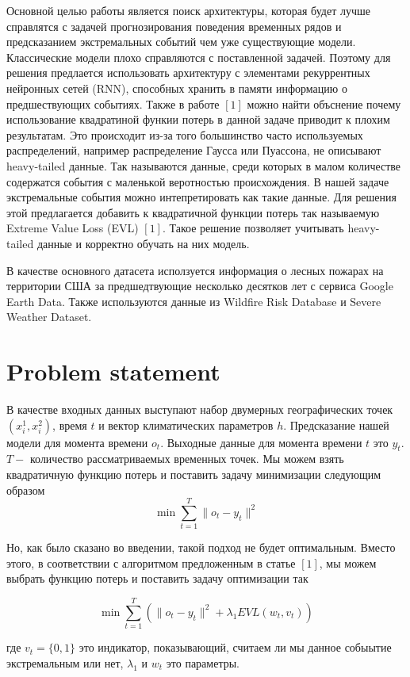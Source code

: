 \documentclass{article}
\begin{document}
Основной целью работы является поиск архитектуры, которая будет лучше справлятся с задачей прогнозирования поведения временных рядов и предсказанием экстремальных событий чем уже существующие модели. Классические модели плохо справляются с поставленной задачей. Поэтому для решения предлается использовать архитектуру с элементами рекуррентных нейронных сетей (RNN), способных хранить в памяти информацию о предшествующих событиях.  Также в работе $[1]$ можно найти объснение почему использование квадратиной функии потерь в данной задаче приводит к плохим результатам. Это происходит из-за того большинство часто используемых распределений, например распределение Гаусса или Пуассона, не описывают heavy-tailed данные. Так называются данные, среди которых в малом количестве содержатся события с маленькой веротностью происхождения. В нашей задаче экстремальные события можно интепретировать как такие данные. Для решения этой предлагается добавить к квадратичной функции потерь так называемую Extreme Value Loss (EVL) $[1]$. Такое решение позволяет учитывать  heavy-tailed данные и корректно обучать на них модель. 

В качестве основного датасета исползуется информация о лесных пожарах на территории США за предшедтвующие несколько десятков лет  с сервиса Google Earth Data. Также используются данные из Wildfire Risk Database и Severe Weather Dataset. 




\section{Problem statement}
\label{sec:headings}

В качестве входных данных выступают набор двумерных географических точек $(x_i^1, x_i^2)$, время $t$ и вектор климатических параметров $h$. Предсказание нашей модели для момента времени $o_t$. Выходные данные для момента времени $t$ это $y_t$. $T - $ количество рассматриваемых временных точек. Мы можем взять квадратичную функцию потерь и поставить задачу минимизации следующим образом
$$\min\sum\limits_{t = 1}^T\|o_t - y_t\|^2$$

Но, как было сказано во введении, такой подход не будет оптимальным. Вместо этого, в соответствии с алгоритмом предложенным в статье $[1]$, мы можем выбрать функцию потерь и поставить задачу оптимизации так 

$$\min\sum\limits_{t = 1}^T(\|o_t - y_t\|^2 + \lambda_1 EVL(w_t, v_t))$$

где $v_t = \{0, 1\}$ это индикатор, показывающий, считаем ли мы данное собыытие экстремальным или нет, $\lambda_1$ и $w_t$ это параметры.




 


\end{document}
